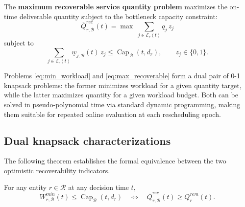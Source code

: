 The \textbf{maximum recoverable service quantity problem} maximizes the on-time deliverable quantity subject to the bottleneck capacity constraint:
\begin{equation}\label{eq:max_recoverable}
\overline Q_{r,\mathcal B}^{rec}(t)=
\max\;\sum_{j\in\mathcal E_r(t)}q_j\,z_j
\end{equation}
subject to
\begin{equation}
\sum_{j\in\mathcal E_r(t)}\underline w_{j,\mathcal B}(t)\,z_j\le\operatorname{Cap}_{\mathcal B}(t,d_r),\qquad z_j\in\{0,1\}.
\end{equation}

Problems \eqref{eq:min_workload} and \eqref{eq:max_recoverable} form a dual pair of 0-1 knapsack problems: the former minimizes workload for a given quantity target, while the latter maximizes quantity for a given workload budget. Both can be solved in pseudo-polynomial time via standard dynamic programming, making them suitable for repeated online evaluation at each rescheduling epoch.

\subsection{Dual knapsack characterizations}
\label{sec:dual_knapsack}

The following theorem establishes the formal equivalence between the two optimistic recoverability indicators.

\begin{theorem}\label{thm:dual_knapsack}
For any entity $r\in\mathcal R$ at any decision time $t$,
\begin{equation}\label{eq:equivalence}
W_{r,\mathcal B}^{min}(t)\le\operatorname{Cap}_{\mathcal B}(t,d_r)
\quad\iff\quad
\overline Q_{r,\mathcal B}^{rec}(t)\ge Q_r^{rem}(t).
\end{equation}
\end{theorem}

